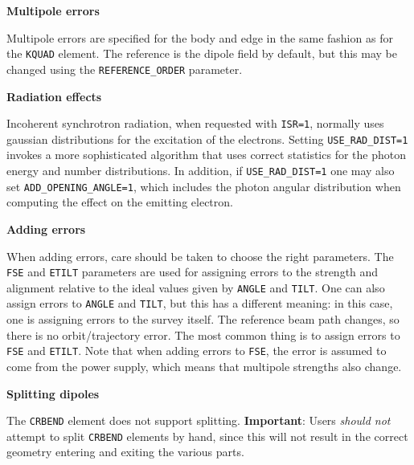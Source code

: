{\bf Multipole errors}

Multipole errors are specified for the body and edge in the same fashion as for the
\verb|KQUAD| element.
The reference is the dipole field by default, but this may be changed using the
\verb|REFERENCE_ORDER| parameter.

{\bf Radiation effects}

Incoherent synchrotron radiation, when requested with {\tt ISR=1},
normally uses gaussian distributions for the excitation of the electrons.
Setting {\tt USE\_RAD\_DIST=1} invokes a more sophisticated algorithm that
uses correct statistics for the photon energy and number distributions.
In addition, if {\tt USE\_RAD\_DIST=1} one may also set {\tt ADD\_OPENING\_ANGLE=1},
which includes the photon angular distribution when computing the effect on 
the emitting electron.  

{\bf Adding errors}

When adding errors, care should be taken to choose the right
parameters.  The \verb|FSE| and \verb|ETILT| parameters are used for
assigning errors to the strength and alignment relative to the ideal
values given by \verb|ANGLE| and \verb|TILT|.  One can also assign 
errors to \verb|ANGLE| and \verb|TILT|, but this has a different meaning:
in this case, one is assigning errors to the survey itself.  The reference
beam path changes, so there is no orbit/trajectory error. The most common
thing is to assign errors to \verb|FSE| and \verb|ETILT|.  Note that when
adding errors to \verb|FSE|, the error is assumed to come from the power
supply, which means that multipole strengths also change.

{\bf Splitting dipoles}

The \verb|CRBEND| element does not support splitting.
{\bf Important}: Users {\em should not} attempt to split \verb|CRBEND| elements by hand, since this
will not result in the correct geometry entering and exiting the various parts.
